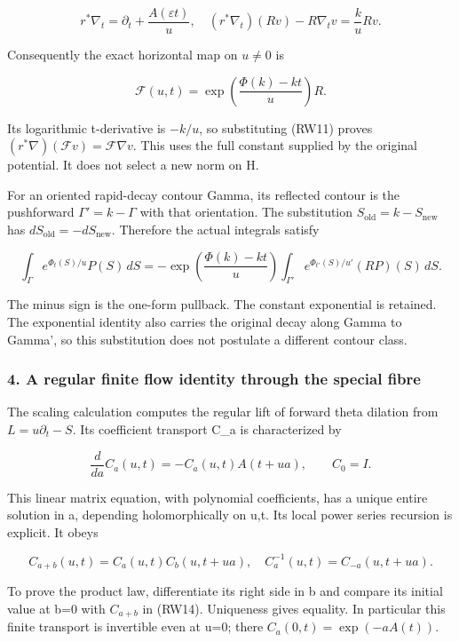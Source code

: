 \[
r^*\nabla_t=\partial_t+\frac{A(\varepsilon t)}u,
\quad
(r^*\nabla_t)(Rv)-R\nabla_tv=\frac ku Rv.
\tag{RW11}
\]

Consequently the exact horizontal map on \(u\ne0\) is

\[
\boxed{\mathcal F(u,t)
=\exp\!\left(\frac{\Phi(k)-kt}{u}\right)R.}
\tag{RW12}
\]

Its logarithmic t-derivative is \(-k/u\), so substituting (RW11) proves \((r^*\nabla)(\mathcal Fv)=\mathcal F\nabla v\). This uses the full constant supplied by the original potential. It does not select a new norm on H.

For an oriented rapid-decay contour Gamma, its reflected contour is the pushforward \(\Gamma'=k-\Gamma\) with that orientation. The substitution \(S_{\mathrm{old}}=k-S_{\mathrm{new}}\) has \(dS_{\mathrm{old}}=-dS_{\mathrm{new}}\). Therefore the actual integrals satisfy

\[
\int_\Gamma e^{\Phi_t(S)/u}P(S)\,dS
=-\exp\!\left(\frac{\Phi(k)-kt}{u}\right)
\int_{\Gamma'} e^{\Phi_{t'}(S)/u'}(RP)(S)\,dS.
\tag{RW13}
\]

The minus sign is the one-form pullback. The constant exponential is retained. The exponential identity also carries the original decay along Gamma to Gamma', so this substitution does not postulate a different contour class.

\subsubsection{4. A regular finite flow identity through the special fibre}\label{endpoint-f1_reflection--a-regular-finite-flow-identity-through-the-special-fibre}

The scaling calculation computes the regular lift of forward theta dilation from \(L=u\partial_t-S\). Its coefficient transport C\_a is characterized by

\[
\frac{d}{da}C_a(u,t)=-C_a(u,t)A(t+ua),\qquad C_0=I.
\tag{RW14}
\]

This linear matrix equation, with polynomial coefficients, has a unique entire solution in a, depending holomorphically on u,t. Its local power series recursion is explicit. It obeys

\[
C_{a+b}(u,t)=C_a(u,t)C_b(u,t+ua),
\quad C_a^{-1}(u,t)=C_{-a}(u,t+ua).
\tag{RW15}
\]

To prove the product law, differentiate its right side in b and compare its initial value at b=0 with \(C_{a+b}\) in (RW14). Uniqueness gives equality. In particular this finite transport is invertible even at u=0; there \(C_a(0,t)=\exp(-aA(t))\).

